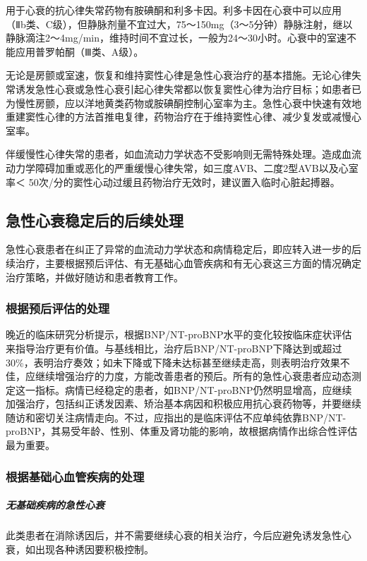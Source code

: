 用于心衰的抗心律失常药物有胺碘酮和利多卡因。利多卡因在心衰中可以应用（Ⅱb类、C级），但静脉剂量不宜过大，75～150mg（3～5分钟）静脉注射，继以静脉滴注2～4mg/min，维持时间不宜过长，一般为24～30小时。心衰中的室速不能应用普罗帕酮（Ⅲ类、A级）。

无论是房颤或室速，恢复和维持窦性心律是急性心衰治疗的基本措施。无论心律失常诱发急性心衰或急性心衰引起心律失常都以恢复窦性心律为治疗目标；如患者已为慢性房颤，应以洋地黄类药物或胺碘酮控制心室率为主。急性心衰中快速有效地重建窦性心律的方法首推电复律，药物治疗在于维持窦性心律、减少复发或减慢心室率。

伴缓慢性心律失常的患者，如血流动力学状态不受影响则无需特殊处理。造成血流动力学障碍加重或恶化的严重缓慢心律失常，如三度AVB、二度2型AVB以及心室率＜
50次/分的窦性心动过缓且药物治疗无效时，建议置入临时心脏起搏器。

\subsection{急性心衰稳定后的后续处理}

急性心衰患者在纠正了异常的血流动力学状态和病情稳定后，即应转入进一步的后续治疗，主要根据预后评估、有无基础心血管疾病和有无心衰这三方面的情况确定治疗策略，并做好随访和患者教育工作。

\subsubsection{根据预后评估的处理}

晚近的临床研究分析提示，根据BNP/NT-proBNP水平的变化较按临床症状评估来指导治疗更有价值。与基线相比，治疗后BNP/NT-proBNP下降达到或超过30\%，表明治疗奏效；如未下降或下降未达标甚至继续走高，则表明治疗效果不佳，应继续增强治疗的力度，方能改善患者的预后。所有的急性心衰患者应动态测定这一指标。病情已经稳定的患者，如BNP/NT-proBNP仍然明显增高，应继续加强治疗，包括纠正诱发因素、矫治基本病因和积极应用抗心衰药物等，并要继续随访和密切关注病情走向。不过，应指出的是临床评估不应单纯依靠BNP/NT-proBNP，其易受年龄、性别、体重及肾功能的影响，故根据病情作出综合性评估最为重要。

\subsubsection{根据基础心血管疾病的处理}

\subparagraph{无基础疾病的急性心衰}

此类患者在消除诱因后，并不需要继续心衰的相关治疗，今后应避免诱发急性心衰，如出现各种诱因要积极控制。

